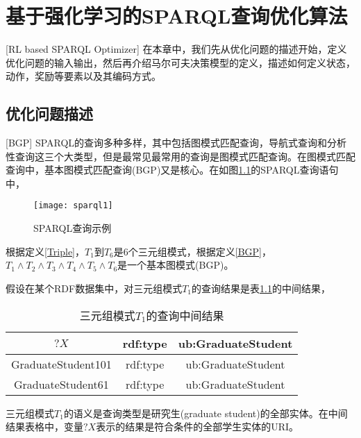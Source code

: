 \chapter{基于强化学习的SPARQL查询优化算法}[RL based SPARQL Optimizer]
在本章中，我们先从优化问题的描述开始，定义优化问题的输入输出，然后再介绍马尔可夫决策模型的定义，描述如何定义状态，动作，奖励等要素以及其编码方式。

\section{优化问题描述}[BGP]
SPARQL的查询多种多样，其中包括图模式匹配查询，导航式查询和分析性查询这三个大类型，但是最常见最常用的查询是图模式匹配查询。在图模式匹配查询中，基本图模式匹配查询(BGP)又是核心。在如图\ref{sparql1}的SPARQL查询语句中，
\begin{figure}[h]
    \centering
    \texttt{[image: sparql1]}
    \caption{SPARQL查询示例}
    \label{sparql1}
\end{figure}
根据定义\ref{Triple}，$T_1$到$T_6$是6个三元组模式，根据定义\ref{BGP}，$T_1\wedge T_2\wedge T_3\wedge T_4\wedge T_5\wedge T_6$是一个基本图模式(BGP)。

假设在某个RDF数据集中，对三元组模式$T_1$的查询结果是表\ref{T1}的中间结果，
\begin{table}[htbp]
    \caption[table1]{三元组模式$T_1$的查询中间结果}
    \label{T1}
    \vspace{0.5em}\centering\wuhao
    \begin{tabular}{|c|c|c|}
    \toprule[1.5pt]
    $?X$ & rdf:type & ub:GraduateStudent\\
    \midrule[1pt]
    GraduateStudent101 & rdf:type & ub:GraduateStudent\\
    GraduateStudent61 & rdf:type &ub:GraduateStudent\\
    \bottomrule[1.5pt]
    \end{tabular}
\end{table}
三元组模式$T_1$的语义是查询类型是研究生(graduate student)的全部实体。在中间结果表格中，变量$?X$表示的结果是符合条件的全部学生实体的URI。

